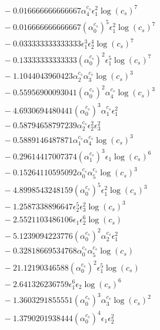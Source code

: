 \documentclass[10pt]{article}
\begin{document}
\begin{align*}
&{}  - 0.016666666666667 \alpha_{4}^{c_s} \epsilon_{1}^{2} \log{\left(c_{s} \right)}^{7} \\
&{}  - 0.016666666666667 \left(\alpha_{0}^{c_s}\right)^{5} \epsilon_{1}^{2} \log{\left(c_{s} \right)}^{7} \\
&{}  - 0.033333333333333 \epsilon_{1}^{3} \epsilon_{2}^{4} \log{\left(c_{s} \right)}^{7} \\
&{}  - 0.13333333333333 \left(\alpha_{0}^{c_s}\right)^{2} \epsilon_{1}^{5} \log{\left(c_{s} \right)}^{7} \\
&{}  - 1.1044043960423 \alpha_{2}^{c_s} \alpha_{3}^{c_s} \log{\left(c_{s} \right)}^{3} \\
&{}  - 0.55956900093041 \left(\alpha_{0}^{c_s}\right)^{2} \alpha_{4}^{c_s} \log{\left(c_{s} \right)}^{3} \\
&{}  - 4.6930694480441 \left(\alpha_{0}^{c_s}\right)^{3} \alpha_{1}^{c_s} \epsilon_{1}^{2} \\
&{}  - 0.58794658797239 \alpha_{2}^{c_s} \epsilon_{2}^{2} \epsilon_{3}^{2} \\
&{}  - 0.5889146487871 \alpha_{1}^{c_s} \alpha_{4}^{c_s} \log{\left(c_{s} \right)}^{3} \\
&{}  - 0.29614417007374 \left(\alpha_{1}^{c_s}\right)^{3} \epsilon_{1} \log{\left(c_{s} \right)}^{6} \\
&{}  - 0.15264110595092 \alpha_{0}^{c_s} \alpha_{5}^{c_s} \log{\left(c_{s} \right)}^{3} \\
&{}  - 4.8998543248159 \left(\alpha_{0}^{c_s}\right)^{5} \epsilon_{1}^{2} \log{\left(c_{s} \right)}^{3} \\
&{}  - 1.2587338896647 \epsilon_{2}^{5} \epsilon_{3}^{2} \log{\left(c_{s} \right)}^{3} \\
&{}  - 2.5521103486106 \epsilon_{1} \epsilon_{2}^{6} \log{\left(c_{s} \right)} \\
&{}  - 5.1239094223776 \left(\alpha_{0}^{c_s}\right)^{2} \alpha_{2}^{c_s} \epsilon_{1}^{2} \\
&{}  - 0.32818669534768 \alpha_{0}^{c_s} \alpha_{5}^{c_s} \log{\left(c_{s} \right)} \\
&{}  - 21.12190346588 \left(\alpha_{0}^{c_s}\right)^{2} \epsilon_{1}^{5} \log{\left(c_{s} \right)} \\
&{}  - 2.641326236759 \epsilon_{1}^{6} \epsilon_{2} \log{\left(c_{s} \right)}^{6} \\
&{}  - 1.3603291855551 \left(\alpha_{0}^{c_s}\right)^{3} \alpha_{3}^{c_s} \log{\left(c_{s} \right)}^{2} \\
&{}  - 1.3790201938444 \left(\alpha_{0}^{c_s}\right)^{4} \epsilon_{1} \epsilon_{2}^{2} \\

\end{align*}
\end{document}
